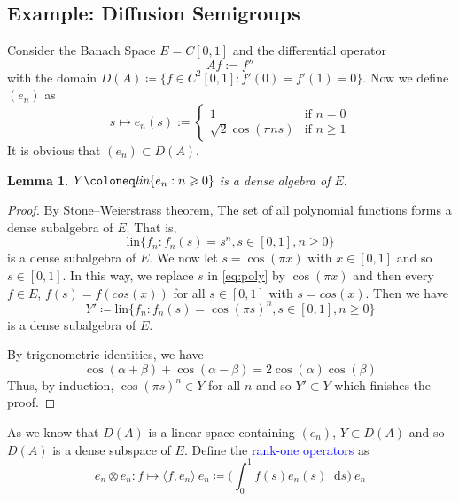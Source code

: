 \documentclass[12pt, reqno]{amsart}
\renewcommand{\geq}{\geqslant}
\newcommand{\1}{\mathbbm 1}
\newcommand*\diff{\mathop{}\!\mathrm{d}}
\theoremstyle{plain}
\newtheorem{lemma}[theorem]{Lemma}
\theoremstyle{definition}
\newcommand{\navy}[1]{\textcolor{blue}{#1}}
\begin{document}
\subsection{Example: Diffusion Semigroups} 

Consider the Banach
Space $E = C[0,1]$ and the differential operator 
%
\begin{equation*}
Af:=f''
\end{equation*}  
with the domain $D(A)\coloneq\{f\in C^2[0,1]:f'(0)=f'(1)=0\}.$ Now we define $(e_n)$ as
\begin{equation*}
s\mapsto e_n(s) :=\begin{cases}1 & \text{if $n =0$} \\
                                                   \sqrt{2} \cos(\pi n s) & \text{if $n\geq 1$}
                             \end{cases}
\end{equation*}
It is obvious that $(e_n)\subset D(A).$
\begin{lemma}
 $Y\coloneq \emph{lin}\{e_n:n\geq0\}$ is a dense algebra of $E.$
\end{lemma}
\begin{proof}
	By Stone–Weierstrass theorem,  The set of all polynomial functions forms a  dense subalgebra of $E$. That is,
	\begin{equation}\label{eq:poly}
	\text{lin}\{f_n: f_n(s)=s^n, s\in[0,1], n\geq0\}
	\end{equation} is a dense subalgebra of $E.$ We now let $s=\cos(\pi x)$ with $x\in[0,1]$ and so $s\in[0,1]$. In this way, we replace $s$ in \eqref{eq:poly} by $\cos(\pi x)$ and then every $f\in E$, $f(s)=f(cos(x))$ for all $s\in[0,1]$ with $s=cos(x)$. Then we have
	\begin{equation*}
	Y'\coloneq\text{lin}\{f_n: f_n(s)=\cos(\pi s)^n, s\in[0,1], n\geq0\}
	\end{equation*} is a dense subalgebra of $E.$ 
	
	By trigonometric identities, we have
	\begin{equation}\label{eq:trigo}
	\cos(\alpha+\beta)+\cos(\alpha-\beta)=2\cos(\alpha)\cos(\beta)
	\end{equation}
	Thus, by induction, $\cos(\pi s)^n\in Y$ for all $n$ and so $ Y'\subset Y$ which finishes the proof.
\end{proof}
As we know that $D(A)$ is a linear space containing $(e_n)$, $Y\subset D(A)$ and so $D(A)$ is a dense subspace of $E.$ Define the \navy{rank-one operators} as
\begin{equation*}
e_n\otimes e_n\colon f\mapsto \big \langle f,e_n \big \rangle\ e_n\coloneq \Big (\int_{0}^{1}f(s)e_n(s)\diff s\Big)\ e_n
\end{equation*}
\end{document}
